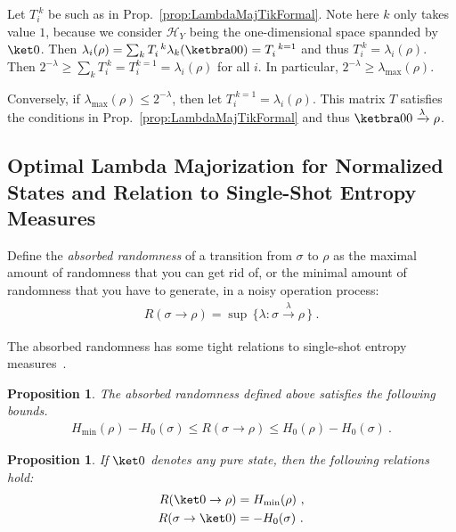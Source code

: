 \documentclass[11pt,a4paper]{article}
\theoremstyle{plain}
\newtheorem{prop}[thm]{Proposition}
\def\Hs{\mathscr{H}}%
\def\HH{{H}}%
\def\Hmin{\HH_\mathrm{min}}
\def\Hzero{\HH_0}
\newenvironment{myproof}[1][\proofname]{%
  \color{prooftextcolor} \footnotesize \proof[\itshape #1]\hspace*{1.2mm}%
}{\endproof}
\newcommand{\lambdamaj}[1]{\xrightarrow{#1}}
\begin{document}
\begin{myproof}[Proof of Prop.~\ref{prop:LambdaMajorizedDOpsByPureState}]
  Let $T_i^{~k}$ be such as in Prop.~\ref{prop:LambdaMajTikFormal}. Note here $k$ only takes value
  $1$, because we consider $\Hs_Y$ being the one-dimensional space spannded by $\ket0$. Then
  $\lambda_i(\rho) = \sum_k T_i^{~k} \lambda_k(\ketbra00) = T_i^{~k=1}$ and thus
  $T_i^{~k}=\lambda_i(\rho)$. Then $2^{-\lambda} \geqslant \sum_k T_i^{~k} = T_i^{k=1} = \lambda_i(\rho)$ for
  all $i$. In particular, $2^{-\lambda}\geqslant \lambda_\mathrm{max}(\rho)$.

  Conversely, if $\lambda_\mathrm{max}(\rho) \leqslant 2^{-\lambda}$, then let $T_i^{~k=1}=\lambda_i(\rho)$. This
  matrix $T$ satisfies the conditions in Prop.~\ref{prop:LambdaMajTikFormal} and thus
  $\ketbra00\lambdamaj\lambda\rho$.
\end{myproof}


\subsection{Optimal Lambda Majorization for Normalized States and Relation to Single-Shot Entropy Measures}

Define the {\em absorbed randomness} of a transition from $\sigma$ to $\rho$ as the maximal amount of randomness
that you can get rid of, or the minimal amount of randomness that you have to generate, in a noisy operation
process:
\begin{align}
  \label{eq:AbsorbedRandomnessDef}
  R(\sigma\rightarrow\rho) = \sup\, \bigl\{ \lambda : \sigma \lambdamaj{\lambda} \rho \, \bigr\}\ .
\end{align}

The absorbed randomness has some tight relations to single-shot entropy measures~\cite{PhdRenner2005_SQKD}.

\begin{prop}
  \label{prop:RBoundsHminmax}
  The absorbed randomness defined above satisfies the following bounds.
  \begin{align*}
    \Hmin(\rho)-\Hzero(\sigma) \leqslant R(\sigma\rightarrow\rho) \leqslant \Hzero(\rho) - \Hzero(\sigma) \ .
  \end{align*}
\end{prop}

\begin{prop}
  \label{prop:RpurerhoAndRsigmapure}
  If $\ket0$ denotes any pure state, then the following relations hold:
  \begin{align}
    \label{eq:Rpurerho}  R(\ket 0 \rightarrow \rho) &= \Hmin(\rho)\ ,\\
    \label{eq:Rsigmapure}  R(\sigma \rightarrow \ket 0) &= -\Hzero(\sigma)\ .
  \end{align}
\end{prop}
\end{document}
